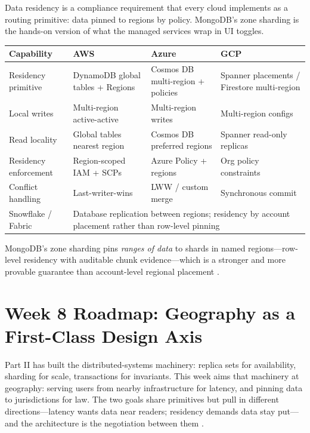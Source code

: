 \begin{crosscloud}
Data residency is a compliance requirement that every cloud implements as a routing primitive: data pinned to regions by policy. MongoDB's zone sharding is the hands-on version of what the managed services wrap in UI toggles.

\vspace{2mm}
{\footnotesize
\begin{tabular}{@{}p{2.9cm}p{3.0cm}p{3.0cm}p{3.0cm}@{}} 
\toprule
\textbf{Capability} & \textbf{AWS} & \textbf{Azure} & \textbf{GCP} \\
\midrule
Residency primitive & DynamoDB global tables + Regions & Cosmos DB multi-region + policies & Spanner placements / Firestore multi-region \\
Local writes & Multi-region active-active & Multi-region writes & Multi-region configs \\
Read locality & Global tables nearest region & Cosmos DB preferred regions & Spanner read-only replicas \\
Residency enforcement & Region-scoped IAM + SCPs & Azure Policy + regions & Org policy constraints \\
Conflict handling & Last-writer-wins & LWW / custom merge & Synchronous commit \\
\addlinespace
Snowflake / Fabric & \multicolumn{3}{l}{Database replication between regions; residency by account placement rather than row-level pinning} \\
\bottomrule
\end{tabular}}

\vspace{1mm}
MongoDB's zone sharding pins \emph{ranges of data} to shards in named regions---row-level residency with auditable chunk evidence---which is a stronger and more provable guarantee than account-level regional placement \cite{mongodbZoneShardingDocs,mongodbGlobalClustersDocs}.
\end{crosscloud}

\section{Week 8 Roadmap: Geography as a First-Class Design Axis}
Part II has built the distributed-systems machinery: replica sets for availability, sharding for scale, transactions for invariants. This week aims that machinery at geography: serving users from nearby infrastructure for latency, and pinning data to jurisdictions for law. The two goals share primitives but pull in different directions---latency wants data near readers; residency demands data stay put---and the architecture is the negotiation between them \cite{mongodbGlobalClustersDocs}.

